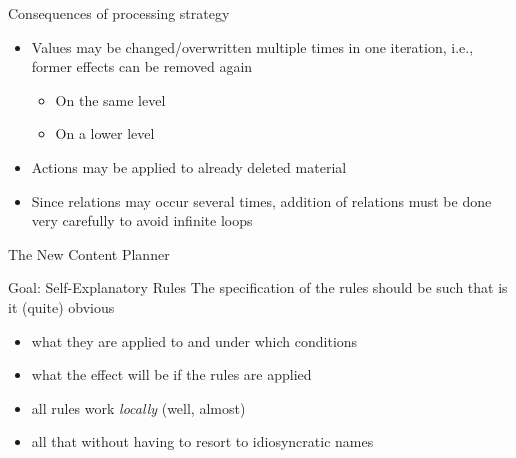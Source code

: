 \documentclass{beamer}
\begin{document}

\begin{frame}{Consequences of processing strategy}
  \begin{itemize}
  \item Values may be changed/overwritten multiple times in one iteration,
    i.e., former effects can be removed again
    \begin{itemize}
    \item On the same level
    \item On a lower level
    \end{itemize}
  \item Actions may be applied to already deleted material
  \item Since relations may occur several times, addition of relations must
    be done very carefully to avoid infinite loops
  \end{itemize}
\end{frame}


\begin{frame}{The New Content Planner}
  \begin{block}{Goal: Self-Explanatory Rules}
    The specification of the rules should be such that is it (quite) obvious
    \begin{itemize}
    \item what they are applied to and under which conditions
    \item what the effect will be if the rules are applied
    \item all rules work \emph{locally} (well, almost)
    \item all that without having to resort to idiosyncratic names
    \end{itemize}
  \end{block}
\end{frame}

\end{document}
